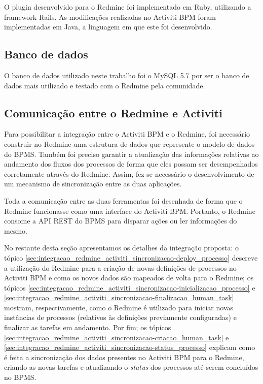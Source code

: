 O plugin desenvolvido para o Redmine foi implementado em Ruby\cite{ruby-lang}, utilizando a framework Rails\cite{rails}.
As modificações realizadas no Activiti BPM foram implementadas em Java, a linguagem em que este foi desenvolvido.

\subsection{Banco de dados}\label{sec:integracao_redmine_activiti_implementacao__bd}

O banco de dados utilizado neste trabalho foi o MySQL 5.7 por ser o banco de dados mais utilizado e testado com o Redmine pela comunidade.

\subsection{Comunicação entre o Redmine e Activiti}\label{sec:integracao_redmine_activiti_implementacao_sincronizacao}

Para possibilitar a integração entre o Activiti BPM e o Redmine, foi necessário construir no Redmine uma estrutura de dados que represente o modelo de dados do BPMS. Também foi preciso garantir a atualização das informações relativas ao andamento dos fluxos dos processos de forma que eles possam ser desempenhados corretamente através do Redmine. Assim, fez-se necessário o desenvolvimento de um mecanismo de sincronização entre as duas aplicações.

Toda a comunicação entre as duas ferramentas foi desenhada de forma que o Redmine funcionasse como uma interface do Activiti BPM. Portanto, o Redmine consome a API REST do BPMS para disparar ações ou ler informações do mesmo.

No restante desta seção apresentamos os detalhes da integração proposta: o tópico \ref{sec:integracao_redmine_activiti_sincronizacao-deploy_processo} descreve a utilização do Redmine para  a criação de novas definições de processos no Activiti BPM e como os novos dados são mapeados de volta para o Redmine; os tópicos \ref{sec:integracao_redmine_activiti_sincronizacao-inicializacao_processo} e \ref{sec:integracao_redmine_activiti_sincronizacao-finalizacao_human_task} mostram, respectivamente, como o Redmine é utilizado para iniciar novas instâncias de processos (relativos às definições previamente configuradas) e finalizar as tarefas em andamento. Por fim; os tópicos \ref{sec:integracao_redmine_activiti_sincronizacao-criacao_human_task} e \ref{sec:integracao_redmine_activiti_sincronizacao-status_processo} explicam como é feita a sincronização dos dados presentes no Activiti BPM para o Redmine, criando as novas tarefas e atualizando o \textit{status} dos processos até serem concluídos no BPMS.


